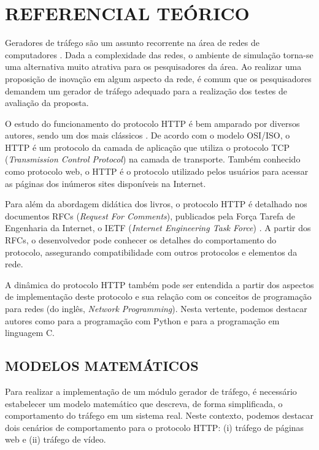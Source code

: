 \section{REFERENCIAL TEÓRICO}
Geradores de tráfego são um assunto recorrente na área de redes de computadores \cite{Cheng2013}. Dada a complexidade das redes, o ambiente de simulação torna-se uma alternativa muito atrativa para os pesquisadores da área. Ao realizar uma proposição de inovação em algum aspecto da rede, é comum que os pesquisadores demandem um gerador de tráfego adequado para a realização dos testes de avaliação da proposta.

O estudo do funcionamento do protocolo HTTP é bem amparado por diversos autores, sendo um dos mais clássicos \cite{Kurose2013}. De acordo com o modelo OSI/ISO, o HTTP é um protocolo da camada de aplicação que utiliza o protocolo TCP (\textit{Transmission Control Protocol}) na camada de transporte. Também conhecido como protocolo web, o HTTP é o protocolo utilizado pelos usuários para acessar as páginas dos inúmeros sites disponíveis na Internet.

Para além da abordagem didática dos livros, o protocolo HTTP é detalhado nos documentos RFCs (\textit{Request For Comments}), publicados pela Força Tarefa de Engenharia da Internet, o IETF (\textit{Internet Engineering Task Force}) \cite{IETF2014}. A partir dos RFCs, o desenvolvedor pode conhecer os detalhes do comportamento do protocolo, assegurando compatibilidade com outros protocolos e elementos da rede.

A dinâmica do protocolo HTTP também pode ser entendida a partir dos aspectos de implementação deste protocolo e sua relação com os conceitos de programação para redes (do inglês, \textit{Network Programming}). Nesta vertente, podemos destacar autores como \cite{Rhodes2014} para a programação com Python e \cite{Hall2019} para a programação em linguagem C.

\subsection{MODELOS MATEMÁTICOS}

Para realizar a implementação de um módulo gerador de tráfego, é necessário estabelecer um modelo matemático que descreva, de forma simplificada, o comportamento do tráfego em um sistema real. Neste contexto, podemos destacar dois cenários de comportamento para o protocolo HTTP: (i) tráfego de páginas web e (ii) tráfego de vídeo.

